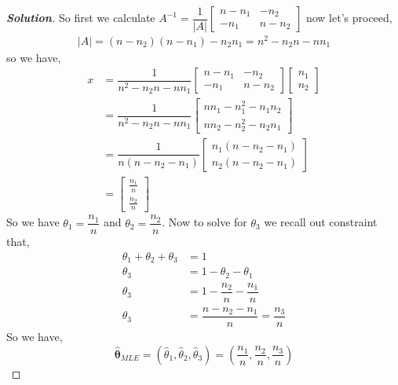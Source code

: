 \documentclass[12pt]{article}
\newenvironment{solution}{\begin{tcolorbox}[breakable]\begin{proof}[\textbf{\textit{Solution}}] }{\end{proof}\end{tcolorbox}}
\begin{document}
\begin{itemize}
\begin{itemize}
\begin{itemize}
\begin{solution}
    So first we calculate $A^{-1} = \dfrac{1}{\lvert A \rvert}\begin{bmatrix}
        n - n_1 & -n_2 \\ 
        -n_1 & n - n_2
    \end{bmatrix}$ now let's proceed,
    \begin{align*}
        \lvert A \rvert = (n-n_2)(n-n_1) - n_2 n_1 = n^{2} - n_2n -nn_1
    \end{align*}
    so we have,
    \begin{align*}
        x &= \dfrac{1}{n^{2} - n_2n -nn_1} \begin{bmatrix}
            n - n_1 & -n_2 \\ 
            -n_1 & n - n_2
        \end{bmatrix} \begin{bmatrix}
            n_1 \\ n_2 
        \end{bmatrix} \\
        &= \dfrac{1}{n^{2} - n_2n -nn_1} \begin{bmatrix}
            nn_1 - n_1^{2} -n_1 n_2 \\
            nn_2 - n_2^{2} -n_2n_1
        \end{bmatrix} \\
        &= \dfrac{1}{n (n - n_2 - n_1) } \begin{bmatrix}
            n_1 (n - n_2 - n_1) \\
            n_2 (n - n_2 - n_1)
        \end{bmatrix} \\
        &= \begin{bmatrix}
            \frac{n_1}{n} \\
            \frac{n_2}{n}
        \end{bmatrix}
    \end{align*}
    So we have $\theta_1 = \dfrac{n_1}{n}$ and $\theta_2 = \dfrac{n_2}{n}$. Now to solve for $\theta_3$ we recall out constraint that,
    \begin{align*}
        \theta_1 + \theta_2 + \theta_3 &= 1 \\
        \theta_3 &= 1 - \theta_2 - \theta_1  \\
        \theta_3 &= 1 - \dfrac{n_2}{n} - \dfrac{n_1}{n} \\
        \theta_3 &=  \dfrac{n -n_2 - n_1}{n}  = \dfrac{n_3}{n}
    \end{align*}
    So we have,
    \[\hat{ \bm{ \theta } }_{ MLE } = \left( \hat{ \theta }_1, \hat{ \theta }_2, \hat{ \theta }_3 \right) = \left( \frac{ n_1 }{ n }, \frac{ n_2 }{ n }, \frac{ n_3 }{ n } \right) \]

\end{solution}
\end{itemize}
\end{itemize}
\end{itemize}
\end{document}
